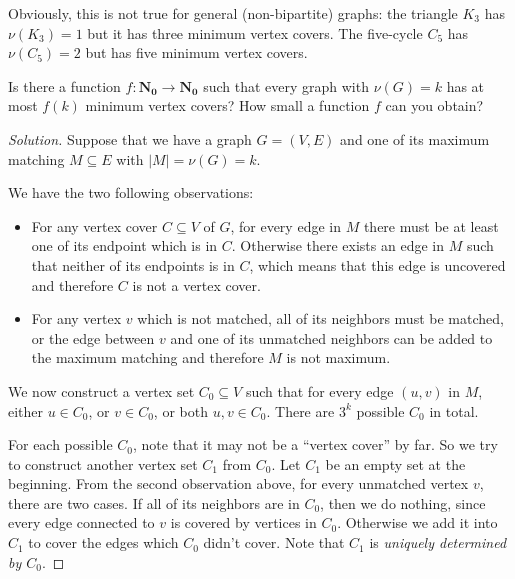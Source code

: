 


    
    Obviously, this is not true for general (non-bipartite) graphs: the triangle $K_3$ has $\nu(K_3) = 1$ but it has three minimum vertex covers. The five-cycle $C_5$ has $\nu(C_5) = 2$ but has five minimum vertex covers.

    \begin{thm}{}{}
        Is there a function $f \colon \mathbf{N_0} \rightarrow \mathbf{N_0}$ such that every graph with $\nu(G) = k$ has at most $f(k)$ minimum vertex covers? How small a function $f$ can you obtain?
    \end{thm}

    \begin{proof}[Solution]
        Suppose that we have a graph $G = (V, E)$ and one of its maximum matching $M \subseteq E$ with $|M| = \nu(G) = k$.
        
        We have the two following observations:
        
        \begin{itemize}
            \item For any vertex cover $C \subseteq V$ of $G$, for every edge in $M$ there must be at least one of its endpoint which is in $C$. Otherwise there exists an edge in $M$ such that neither of its endpoints is in $C$, which means that this edge is uncovered and therefore $C$ is not a vertex cover.
            \item For any vertex $v$ which is not matched, all of its neighbors must be matched, or the edge between $v$ and one of its unmatched neighbors can be added to the maximum matching and therefore $M$ is not maximum.
        \end{itemize}
        
        We now construct a vertex set $C_0 \subseteq V$ such that for every edge $(u, v)$ in $M$, either $u \in C_0$, or $v \in C_0$, or both $u, v \in C_0$. There are $3^k$ possible $C_0$ in total.
        
        For each possible $C_0$, note that it may not be a ``vertex cover'' by far. So we try to construct another vertex set $C_1$ from $C_0$. Let $C_1$ be an empty set at the beginning. From the second observation above, for every unmatched vertex $v$, there are two cases. If all of its neighbors are in $C_0$, then we do nothing, since every edge connected to $v$ is covered by vertices in $C_0$. Otherwise we add it into $C_1$ to cover the edges which $C_0$ didn't cover. Note that $C_1$ is {\it uniquely determined by $C_0$}.
        

\end{proof}
